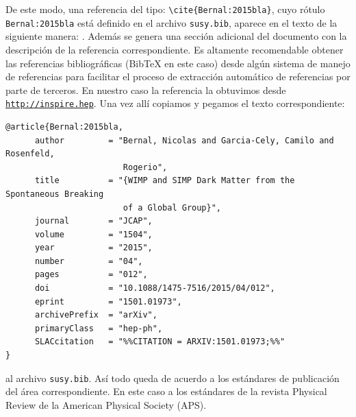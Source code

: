 \documentclass{article}
\begin{document}
De este modo, una referencia del tipo: \verb|\cite{Bernal:2015bla}|, cuyo rótulo \verb|Bernal:2015bla| está definido en el archivo \verb|susy.bib|, aparece en el texto de la siguiente manera: \cite{Bernal:2015bla}. Además se genera una sección adicional del documento con la descripción de la referencia correspondiente. Es altamente recomendable obtener las referencias bibliográficas (BibTeX en este caso) desde algún sistema de manejo de referencias para facilitar el proceso de extracción automático de referencias por parte de terceros. En nuestro caso la referencia la obtuvimos desde \href{http://inspirehep.net/record/1338091/export/hx}{\texttt{http://inspire.hep}}. Una vez allí copiamos y pegamos el texto correspondiente:
\begin{footnotesize}
\begin{lstlisting}
@article{Bernal:2015bla,
      author         = "Bernal, Nicolas and Garcia-Cely, Camilo and Rosenfeld,
                        Rogerio",
      title          = "{WIMP and SIMP Dark Matter from the Spontaneous Breaking
                        of a Global Group}",
      journal        = "JCAP",
      volume         = "1504",
      year           = "2015",
      number         = "04",
      pages          = "012",
      doi            = "10.1088/1475-7516/2015/04/012",
      eprint         = "1501.01973",
      archivePrefix  = "arXiv",
      primaryClass   = "hep-ph",
      SLACcitation   = "%%CITATION = ARXIV:1501.01973;%%"
}
\end{lstlisting}
\end{footnotesize}
al archivo  \verb|susy.bib|. Así todo queda de acuerdo a los estándares de publicación del área correspondiente. En este caso a los estándares de la revista  Physical Review de la American Physical Society  (APS).



\end{document}
